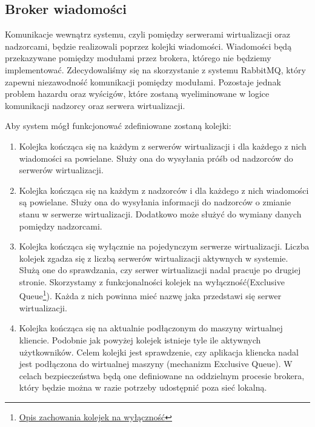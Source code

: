 \documentclass[../deliverable-two.tex]{subfiles}
\begin{document}
\label{external-modules}

\subsection{Broker wiadomości}
\label{external-modules:broker}

Komunikacje wewnątrz systemu, czyli pomiędzy serwerami wirtualizacji oraz nadzorcami, będzie realizowali poprzez kolejki wiadomości.
Wiadomości będą przekazywane pomiędzy modułami przez brokera, którego nie będziemy implementować.
Zdecydowaliśmy się na skorzystanie z systemu RabbitMQ, który zapewni niezawodność komunikacji pomiędzy modułami.
Pozostaje jednak problem hazardu oraz wyścigów, które zostaną wyeliminowane w logice komunikacji nadzorcy oraz serwera wirtualizacji.

Aby system mógł funkcjonować zdefiniowane zostaną kolejki:
\begin{enumerate}[label=(\Roman*)]
	\item \label{virtsrv} Kolejka kończąca się na każdym z serwerów wirtualizacji i dla każdego z nich wiadomości sa powielane.
	      Służy ona do wysyłania próśb od nadzorców do serwerów wirtualizacji.
	\item \label{overseers} Kolejka kończąca się na każdym z nadzorców i dla każdego z nich wiadomości są powielane.
	      Służy ona do wysyłania informacji do nadzorców o zmianie stanu w serwerze wirtualizacji.
	      Dodatkowo może służyć do wymiany danych pomiędzy nadzorcami.
	\item \label{exclusive} Kolejka kończąca się wyłącznie na pojedynczym serwerze wirtualizacji.
	      Liczba kolejek zgadza się z liczbą serwerów wirtualizacji aktywnych w systemie.
	      Służą one do sprawdzania, czy serwer wirtualizacji nadal pracuje po drugiej stronie.
	      Skorzystamy z funkcjonalności kolejek na wyłączność(Exclusive Queue\footnote{\href{https://www.rabbitmq.com/queues.html\#exclusive-queues}{Opis zachowania kolejek na wyłączność}}).
	      Każda z nich powinna mieć nazwę jaka przedstawi się serwer wirtualizacji.
	\item \label{users} Kolejka kończąca się na aktualnie podłączonym do maszyny wirtualnej kliencie.
		  Podobnie jak powyżej kolejek istnieje tyle ile aktywnych użytkowników.
		  Celem kolejki jest sprawdzenie, czy aplikacja kliencka nadal jest podłączona do wirtualnej maszyny (mechanizm Exclusive Queue).
		  W celach bezpieczeństwa będą one definiowane na oddzielnym procesie brokera, który będzie można w razie potrzeby udostępnić poza sieć lokalną.
\end{enumerate}
\end{document}
